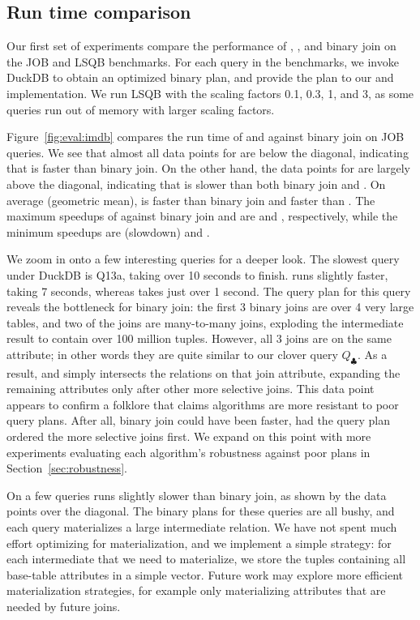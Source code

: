 \subsection{Run time comparison}\label{sec:run-time-comparison}
Our first set of experiments compare the performance of \FJ, \GJ, and binary join
  on the JOB and LSQB benchmarks.
For each query in the benchmarks, we invoke DuckDB to obtain an optimized binary plan,
  and provide the plan to our \FJ and \GJ implementation.
We run LSQB with the scaling factors 0.1, 0.3, 1, and 3, 
  as some queries run out of memory with larger scaling factors.

Figure~\ref{fig:eval:imdb} compares the run time of \FJ and \GJ against binary join on JOB queries.
We see that almost all data points for \FJ are below the diagonal, 
  indicating that \FJ is faster than binary join.
On the other hand, the data points for \GJ are largely above the diagonal, 
  indicating that \GJ is slower than both binary join and \FJ.
On average (geometric mean), \FJ is \imdbavgfjbj faster than binary join 
  and \imdbavgfjgj faster than \GJ.
The maximum speedups of \FJ against binary join and \GJ 
  are \imdbmaxfjbj and \imdbmaxfjgj, respectively, 
  while the minimum speedups are \imdbminfjbj (\imdbmaxbjfj slowdown) and \imdbminfjgj.

We zoom in onto a few interesting queries for a deeper look.
The slowest query under DuckDB is Q13a, taking over 10 seconds to finish.
  \GJ runs slightly faster, taking 7 seconds, 
  whereas \FJ takes just over 1 second.
The query plan for this query reveals the bottleneck for binary join:
  the first 3 binary joins are over 4 very large tables, 
  and two of the joins are many-to-many joins, exploding the 
  intermediate result to contain over 100 million tuples.
However, all 3 joins are on the same attribute;
in other words they are quite  similar to our clover query $Q_\clubsuit$.
As a result, \GJ and \FJ simply intersects the relations 
  on that join attribute, 
  expanding the remaining attributes only after 
  other more selective joins.
This data point appears to confirm a folklore that claims
  \WCOJ algorithms are more resistant to poor query plans.
After all, binary join could have been faster, had the query plan 
  ordered the more selective joins first.
We expand on this point with more experiments evaluating 
  each algorithm's robustness against poor plans in Section~\ref{sec:robustness}.

On a few queries \FJ runs slightly slower than binary join, 
  as shown by the data points over the diagonal.
The binary plans for these queries are all bushy, 
  and each query materializes a large intermediate relation.
We have not spent much effort optimizing for materialization, 
  and we implement a simple strategy: for each intermediate 
  that we need to materialize, we store the tuples containing 
  all base-table attributes in a simple vector.
Future work may explore more efficient materialization strategies, 
  for example only materializing attributes that 
  are needed by future joins.


